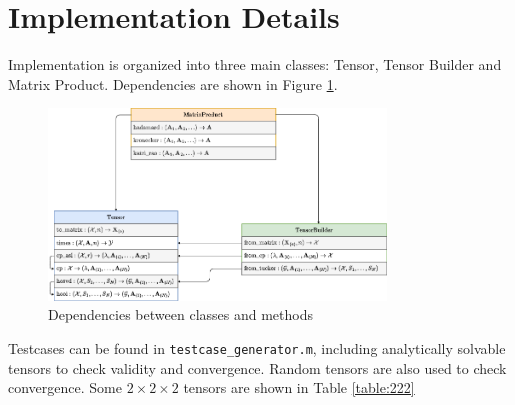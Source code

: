 \section{Implementation Details}

Implementation is organized into three main classes: Tensor, Tensor Builder and Matrix Product. Dependencies are shown in Figure \ref{fig:dependencies}.

\begin{figure}
    \centering
    \includegraphics[width=0.8\textwidth]{img/dependency.png}
    \caption{Dependencies between classes and methods}
    \label{fig:dependencies}
\end{figure}

Testcases can be found in \texttt{testcase\_generator.m}, including analytically solvable tensors to check validity and convergence. Random tensors are also used to check convergence. Some $2\times2\times2$ tensors are shown in Table \ref{table:222}

